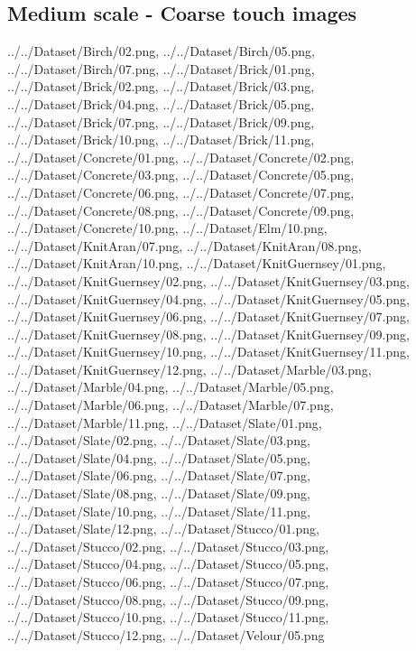 \subsection{Medium scale - Coarse touch images}
{../../Dataset/Birch/02.png,
../../Dataset/Birch/05.png,
../../Dataset/Birch/07.png,
../../Dataset/Brick/01.png,
../../Dataset/Brick/02.png,
../../Dataset/Brick/03.png,
../../Dataset/Brick/04.png,
../../Dataset/Brick/05.png,
../../Dataset/Brick/07.png,
../../Dataset/Brick/09.png,
../../Dataset/Brick/10.png,
../../Dataset/Brick/11.png,
../../Dataset/Concrete/01.png,
../../Dataset/Concrete/02.png,
../../Dataset/Concrete/03.png,
../../Dataset/Concrete/05.png,
../../Dataset/Concrete/06.png,
../../Dataset/Concrete/07.png,
../../Dataset/Concrete/08.png,
../../Dataset/Concrete/09.png,
../../Dataset/Concrete/10.png,
../../Dataset/Elm/10.png,
../../Dataset/KnitAran/07.png,
../../Dataset/KnitAran/08.png,
../../Dataset/KnitAran/10.png,
../../Dataset/KnitGuernsey/01.png,
../../Dataset/KnitGuernsey/02.png,
../../Dataset/KnitGuernsey/03.png,
../../Dataset/KnitGuernsey/04.png,
../../Dataset/KnitGuernsey/05.png,
../../Dataset/KnitGuernsey/06.png,
../../Dataset/KnitGuernsey/07.png,
../../Dataset/KnitGuernsey/08.png,
../../Dataset/KnitGuernsey/09.png,
../../Dataset/KnitGuernsey/10.png,
../../Dataset/KnitGuernsey/11.png,
../../Dataset/KnitGuernsey/12.png,
../../Dataset/Marble/03.png,
../../Dataset/Marble/04.png,
../../Dataset/Marble/05.png,
../../Dataset/Marble/06.png,
../../Dataset/Marble/07.png,
../../Dataset/Marble/11.png,
../../Dataset/Slate/01.png,
../../Dataset/Slate/02.png,
../../Dataset/Slate/03.png,
../../Dataset/Slate/04.png,
../../Dataset/Slate/05.png,
../../Dataset/Slate/06.png,
../../Dataset/Slate/07.png,
../../Dataset/Slate/08.png,
../../Dataset/Slate/09.png,
../../Dataset/Slate/10.png,
../../Dataset/Slate/11.png,
../../Dataset/Slate/12.png,
../../Dataset/Stucco/01.png,
../../Dataset/Stucco/02.png,
../../Dataset/Stucco/03.png,
../../Dataset/Stucco/04.png,
../../Dataset/Stucco/05.png,
../../Dataset/Stucco/06.png,
../../Dataset/Stucco/07.png,
../../Dataset/Stucco/08.png,
../../Dataset/Stucco/09.png,
../../Dataset/Stucco/10.png,
../../Dataset/Stucco/11.png,
../../Dataset/Stucco/12.png,
../../Dataset/Velour/05.png}

\newpage
